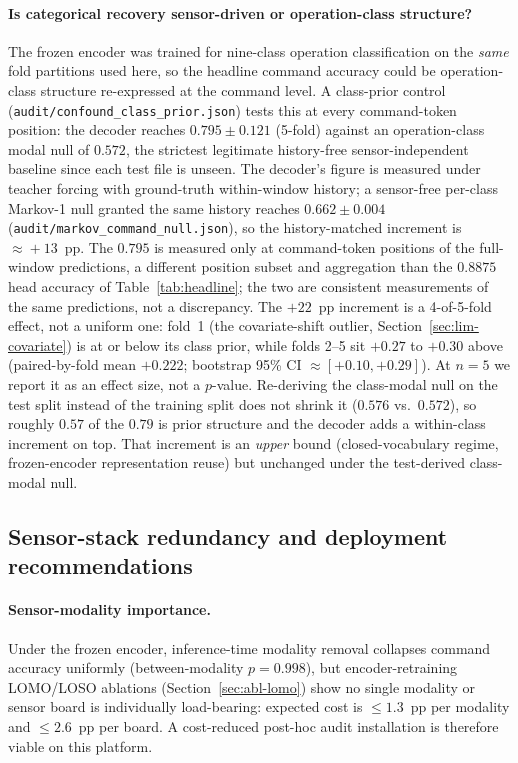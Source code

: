 \documentclass[conference]{IEEEtran}
\begin{document}
\paragraph{Is categorical recovery sensor-driven or operation-class structure?}\label{sec:disc-confound} The frozen encoder was trained for nine-class operation classification on the \emph{same} fold partitions used here, so the headline command accuracy could be operation-class structure re-expressed at the command level. A class-prior control (\texttt{audit/confound\_class\_prior.json}) tests this at every command-token position: the decoder reaches $0.795 \pm 0.121$ (5-fold) against an operation-class modal null of $0.572$, the strictest legitimate history-free sensor-independent baseline since each test file is unseen. The decoder's figure is measured under teacher forcing with ground-truth within-window history; a sensor-free per-class Markov-1 null granted the same history reaches $0.662 \pm 0.004$ (\texttt{audit/markov\_command\_null.json}), so the history-matched increment is $\approx\!+13$~pp. The $0.795$ is measured only at command-token positions of the full-window predictions, a different position subset and aggregation than the $0.8875$ head accuracy of Table~\ref{tab:headline}; the two are consistent measurements of the same predictions, not a discrepancy. The $+22$~pp increment is a 4-of-5-fold effect, not a uniform one: fold~1 (the covariate-shift outlier, Section~\ref{sec:lim-covariate}) is at or below its class prior, while folds 2--5 sit $+0.27$ to $+0.30$ above (paired-by-fold mean $+0.222$; bootstrap 95\% CI $\approx[+0.10,+0.29]$). At $n\!=\!5$ we report it as an effect size, not a $p$-value. Re-deriving the class-modal null on the test split instead of the training split does not shrink it ($0.576$ vs.\ $0.572$), so roughly $0.57$ of the $0.79$ is prior structure and the decoder adds a within-class increment on top. That increment is an \emph{upper} bound (closed-vocabulary regime, frozen-encoder representation reuse) but unchanged under the test-derived class-modal null.

\subsection{Sensor-stack redundancy and deployment recommendations}
\label{sec:disc-deployment-stack}

\paragraph{Sensor-modality importance.}\label{sec:disc-modality} Under the frozen encoder, inference-time modality removal collapses command accuracy uniformly (between-modality $p\!=\!0.998$), but encoder-retraining LOMO/LOSO ablations (Section~\ref{sec:abl-lomo}) show no single modality or sensor board is individually load-bearing: expected cost is $\le\!1.3$~pp per modality and $\le\!2.6$~pp per board. A cost-reduced post-hoc audit installation is therefore viable on this platform.
\end{document}
